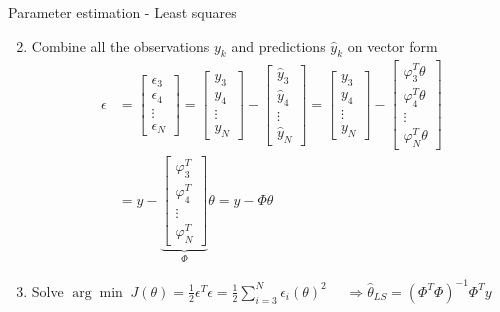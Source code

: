 \documentclass[presentation,aspectratio=169]{beamer}
\begin{document}
\begin{frame}[label={sec:org5ffeb8e}]{Parameter estimation - Least squares}
\begin{enumerate}
\setcounter{enumi}{1}
\item Combine all the observations \(y_k\) and predictions \(\hat{y}_k\) on vector form
\begin{align*}
\epsilon &= \begin{bmatrix} \epsilon_3\\\epsilon_4\\\vdots\\\epsilon_N\end{bmatrix} =  \begin{bmatrix} y_3\\ y_4\\\vdots\\y_N \end{bmatrix} - \begin{bmatrix} \hat{y}_3\\ \hat{y}_4\\\vdots\\\hat{y}_N \end{bmatrix}
 =  \begin{bmatrix} y_3\\ y_4\\\vdots\\y_N \end{bmatrix} - \begin{bmatrix} \varphi_3^T\theta\\ \varphi_4^T\theta\\\vdots\\\varphi_N^T\theta \end{bmatrix}\\
&= y - \underbrace{\begin{bmatrix}\varphi_3^T\\\varphi_4^T\\\vdots\\\varphi_N^T\end{bmatrix}}_{\Phi}\theta = y - \Phi\theta 
\end{align*}
\item Solve \(\arg\min \; J(\theta) = \frac{1}{2}\epsilon^T\epsilon = \frac{1}{2}\sum_{i=3}^N \epsilon_i(\theta)^2\) \(\quad \Rightarrow \hat{\theta}_{LS} = (\Phi^T\Phi)^{-1}\Phi^Ty\)
\end{enumerate}
\end{frame}
\end{document}
